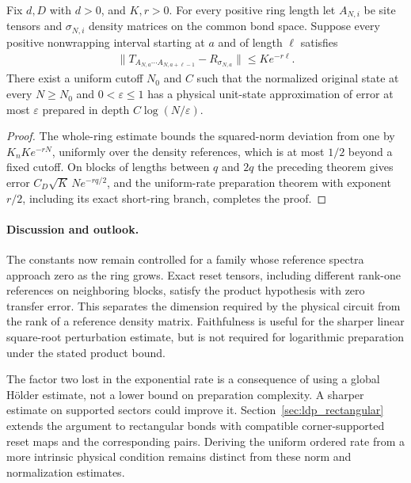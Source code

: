 \begin{lemma}
    \label{thm:ldp_varying_reference_preparation}
    \leanok
    Fix $d,D$ with $d>0$, and $K,r>0$. For every positive ring length let
    $A_{N,i}$ be site tensors and $\sigma_{N,i}$ density matrices on
    the common bond space. Suppose every positive nonwrapping interval
    starting at $a$ and of length $\ell$ satisfies
    \begin{align}
        \|T_{A_{N,a}\cdots A_{N,a+\ell-1}}-R_{\sigma_{N,a}}\|
        \le K e^{-r\ell}.
    \end{align}
    There exist a uniform cutoff $N_0$ and $C$ such that the normalized
    original state at every $N\ge N_0$ and $0<\varepsilon\le1$ has a
    physical unit-state approximation of error at most $\varepsilon$
    prepared in depth $C\log(N/\varepsilon)$.
\end{lemma}
\begin{proof}\leanok
    The whole-ring estimate bounds the squared-norm deviation from one
    by $K_nK e^{-rN}$, uniformly over the density references, which is at
    most $1/2$ beyond a fixed cutoff. On blocks of lengths between $q$ and
    $2q$ the preceding theorem gives error
    $C_D\sqrt K\,N e^{-rq/2}$, and the uniform-rate preparation theorem
    with exponent $r/2$, including its exact short-ring branch, completes
    the proof.
\end{proof}

\paragraph{Discussion and outlook.}
The constants now remain controlled for a family whose reference spectra
approach zero as the ring grows. Exact reset tensors, including different
rank-one references on neighboring blocks, satisfy the product hypothesis
with zero transfer error. This separates the dimension required by the
physical circuit from the rank of a reference density matrix. Faithfulness
is useful for the sharper linear square-root perturbation estimate, but
is not required for logarithmic preparation under the stated product bound.

The factor two lost in the exponential rate is a consequence of using a
global H\"older estimate, not a lower bound on preparation complexity.
A sharper estimate on supported sectors could improve it. Section~\ref{sec:ldp_rectangular}
extends the argument to rectangular bonds with compatible corner-supported
reset maps and the corresponding pairs. Deriving the uniform ordered
rate from a more intrinsic physical condition remains distinct from these
norm and normalization estimates.
